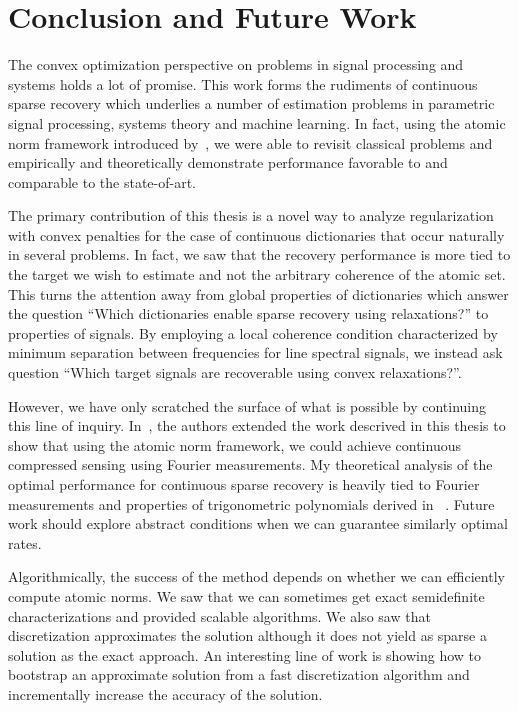 \chapter{Conclusion and Future Work} %
\label{chap:conclusion}

The convex optimization perspective on problems in signal processing and systems
holds a lot of promise. This work forms the rudiments of continuous sparse
recovery which underlies a number of estimation problems in parametric signal
processing, systems theory and machine learning. In fact, using the atomic norm
framework introduced by~\cite{crpw}, we were able to revisit classical problems
and empirically and theoretically demonstrate performance favorable to and
comparable to the state-of-art.

The primary contribution of this thesis is a novel way to analyze regularization
with convex penalties for the case of continuous dictionaries that occur
naturally in several problems. In fact, we saw that the recovery performance is
more tied to the target we wish to estimate and not the arbitrary coherence of
the atomic set. This turns the attention away from global properties of
dictionaries which answer the question ``Which dictionaries enable sparse
recovery using relaxations?'' to properties of signals. By employing a local
coherence condition characterized by minimum separation between frequencies for
line spectral signals, we instead ask question ``Which target signals are
recoverable using convex relaxations?''. 

However, we have only scratched the surface of what is possible by continuing
this line of inquiry. In~\cite{cs_otg}, the authors extended the work descrived
in this thesis to show that using the atomic norm framework, we could achieve
continuous compressed sensing using Fourier measurements. My theoretical
analysis of the optimal performance for continuous sparse recovery is heavily
tied to Fourier measurements and properties of trigonometric polynomials derived
in ~\cite{CandesGranda,cg_noisy}. Future work should explore abstract conditions
when we can guarantee similarly optimal rates.

Algorithmically, the success of the method depends on whether we can efficiently
compute atomic norms. We saw that we can sometimes get exact semidefinite
characterizations and provided scalable algorithms. We also saw that
discretization approximates the solution although it does not yield as sparse a
solution as the exact approach. An interesting line of work is showing how to
bootstrap an approximate solution from a fast discretization algorithm and
incrementally increase the accuracy of the solution. 

